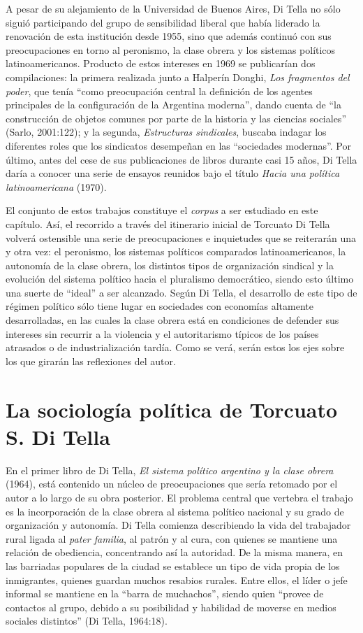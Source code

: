 A pesar de su alejamiento de la Universidad de Buenos Aires, Di Tella no sólo siguió participando del grupo de sensibilidad liberal que había liderado la renovación de esta institución desde 1955, sino que además continuó con sus preocupaciones en torno al peronismo, la clase obrera y los sistemas políticos latinoamericanos. Producto de estos intereses en 1969 se publicarían dos compilaciones: la primera realizada junto a Halperín Donghi, \emph{Los fragmentos del poder}, que tenía ``como preocupación central la definición de los agentes principales de la configuración de la Argentina moderna'', dando cuenta de ``la construcción de objetos comunes por parte de la historia y las ciencias sociales'' (Sarlo, 2001:122); y la segunda, \emph{Estructuras sindicales}, buscaba indagar los diferentes roles que los sindicatos desempeñan en las ``sociedades modernas''. Por último, antes del cese de sus publicaciones de libros durante casi 15 años, Di Tella daría a conocer una serie de ensayos reunidos bajo el título \emph{Hacia una política latinoamericana} (1970).

El conjunto de estos trabajos constituye el \emph{corpus} a ser estudiado en este capítulo. Así, el recorrido a través del itinerario inicial de Torcuato Di Tella volverá ostensible una serie de preocupaciones e inquietudes que se reiterarán una y otra vez: el peronismo, los sistemas políticos comparados latinoamericanos, la autonomía de la clase obrera, los distintos tipos de organización sindical y la evolución del sistema político hacia el pluralismo democrático, siendo esto último una suerte de ``ideal'' a ser alcanzado. Según Di Tella, el desarrollo de este tipo de régimen político sólo tiene lugar en sociedades con economías altamente desarrolladas, en las cuales la clase obrera está en condiciones de defender sus intereses sin recurrir a la violencia y el autoritarismo típicos de los países atrasados o de industrialización tardía. Como se verá, serán estos los ejes sobre los que girarán las reflexiones del autor.

\section{La sociología política de Torcuato S. Di Tella}

En el primer libro de Di Tella, \emph{El sistema político argentino y la clase obrera} (1964), está contenido un núcleo de preocupaciones que sería retomado por el autor a lo largo de su obra posterior. El problema central que vertebra el trabajo es la incorporación de la clase obrera al sistema político nacional y su grado de organización y autonomía. Di Tella comienza describiendo la vida del trabajador rural ligada al \emph{pater familia}, al patrón y al cura, con quienes se mantiene una relación de obediencia, concentrando así la autoridad. De la misma manera, en las barriadas populares de la ciudad se establece un tipo de vida propia de los inmigrantes, quienes guardan muchos resabios rurales. Entre ellos, el líder o jefe informal se mantiene en la ``barra de muchachos'', siendo quien ``provee de contactos al grupo, debido a su posibilidad y habilidad de moverse en medios sociales distintos'' (Di Tella, 1964:18).

